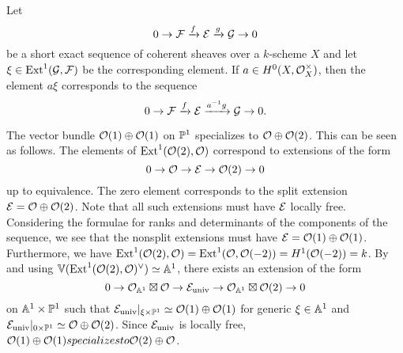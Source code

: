 \begin{remark} \label{rem:scalars-on-ext} Let
	\[ \sesarrows{\mc{F}}{f}{\mc{E}}{g}{\mc{G}} \]
	be a short exact sequence of coherent sheaves over a $k$-scheme $X$ and let $\xi \in \Ext^1(\mc{G},\mc{F})$ be the corresponding element. If $a \in H^0(X,\mc{O}^{\times}_X)$, then the element $a\xi$ corresponds to the sequence
	\[ \sesarrows{\mc{F}}{f}{\mc{E}}{a^{-1}g}{\mc{G}}.\]
\end{remark}

\begin{example}
	The vector bundle $\mc{O}(1)\oplus \mc{O}(1)$ on $\PP^1$ specializes to $\mc{O}\oplus \mc{O}(2)$.
	This can be seen as follows.
	The elements of $\Ext^1(\mc{O}(2),\mc{O})$ correspond to extensions of the form
	\[ \ses{\mc{O}}{\mc{E}}{\mc{O}(2)}\]
	up to equivalence. The zero element corresponds to the split extension $\mc{E} = \mc{O} \oplus \mc{O}(2)$.
	Note that all such extensions must have $\mc{E}$ locally free.
	Considering the formulae for ranks and determinants of the components of the sequence, we see that the nonsplit extensions must have
	$\mc{E}=\mc{O}(1)\oplus\mc{O}(1)$.
	Furthermore, we have $\Ext^1(\mc{O}(2),\mc{O}) = \Ext^1(\mc{O},\mc{O}(-2))=H^1(\mc{O}(-2))=k$.
	By  and using $\VV(\Ext^1(\mc{O}(2),\mc{O})\dual)\simeq \AA^1$, there exists an extension of the form
	\[\ses{\mc{O}_{\AA^1} \boxtimes \mc{O}}{\mc{E}_{\text{univ}}}{\mc{O}_{\AA^1}\boxtimes \mc{O}(2)}\]
	on $\AA^1\times \PP^1$
	such that
	$\mc{E}_{\text{univ}}|_{\xi \times \PP^1} \simeq \mc{O}(1)\oplus\mc{O}(1)$
	for generic $\xi\in\AA^1$
	and 
	$\mc{E}_{\text{univ}}|_{0\times \PP^1} \simeq \mc{O} \oplus \mc{O}(2)$.
	Since $\mc{E}_{\text{univ}}$ is locally free, $\mc{O}(1)\oplus \mc{O}(1) specializes to \mc{O}(2)\oplus \mc{O}$.
\end{example}

